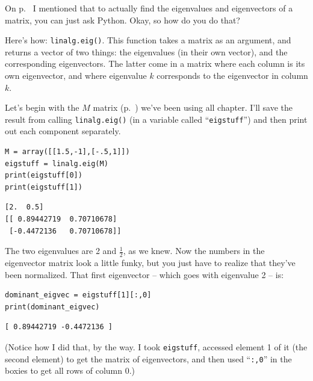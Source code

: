 On p.~\pageref{eigenPython} I mentioned that to actually find the eigenvalues
and eigenvectors of a matrix, you can just ask Python. Okay, so how do you do
that?


Here's how: \texttt{linalg.eig()}. This function takes a matrix as an argument,
and returns a vector of two things: the eigenvalues (in their own vector), and
the corresponding eigenvectors. The latter come in a matrix where each column
is its own eigenvector, and where eigenvalue $k$ corresponds to the eigenvector
in column $k$.

Let's begin with the $M$ matrix (p.~\pageref{mmatrix}) we've been using all
chapter. I'll save the result from calling \texttt{linalg.eig()} (in a variable
called ``\texttt{eigstuff}'') and then print out each component separately.

\begin{Verbatim}[fontsize=\small,samepage=true,frame=single,framesep=3mm]
M = array([[1.5,-1],[-.5,1]])
eigstuff = linalg.eig(M)
print(eigstuff[0])
print(eigstuff[1])
\end{Verbatim}
\vspace{-.2in}

\begin{Verbatim}[fontsize=\small,samepage=true,frame=leftline,framesep=5mm,framerule=1mm]
[2.  0.5]
[[ 0.89442719  0.70710678]
 [-0.4472136   0.70710678]]
\end{Verbatim}


The two eigenvalues are 2 and $\frac{1}{2}$, as we knew. Now the numbers in the
eigenvector matrix look a little funky, but you just have to realize that
they've been normalized. That first eigenvector -- which goes with eigenvalue
2 -- is:

\begin{Verbatim}[fontsize=\small,samepage=true,frame=single,framesep=3mm]
dominant_eigvec = eigstuff[1][:,0]
print(dominant_eigvec)
\end{Verbatim}
\vspace{-.2in}

\begin{Verbatim}[fontsize=\small,samepage=true,frame=leftline,framesep=5mm,framerule=1mm]
[ 0.89442719 -0.4472136 ]
\end{Verbatim}

(Notice how I did that, by the way. I took \texttt{eigstuff}, accessed element
1 of it (the second element) to get the matrix of eigenvectors, and then used
``\texttt{:,0}'' in the boxies to get all rows of column 0.)

